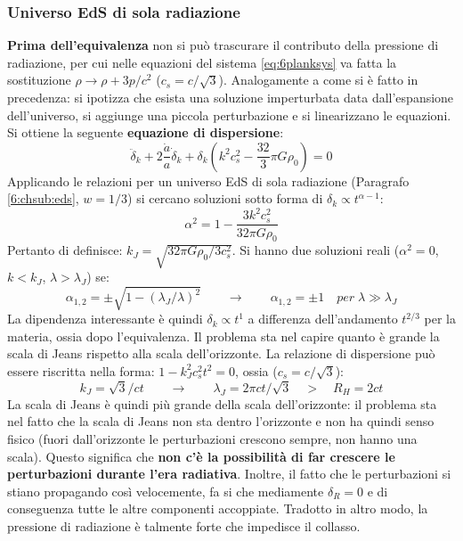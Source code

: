 \subsubsection{Universo EdS di sola radiazione}
\textbf{Prima dell'equivalenza} non si può trascurare il contributo della pressione di radiazione, per cui nelle equazioni del sistema \ref{eq:6planksys} va fatta la sostituzione $\rho \rightarrow \rho + 3p/c^2$ ($c_s=c/\sqrt{3}$). Analogamente a come si è fatto in precedenza: si ipotizza che esista una soluzione imperturbata data dall'espansione dell'universo, si aggiunge una piccola perturbazione e si linearizzano le equazioni. Si ottiene la seguente \textbf{equazione di dispersione}:
\begin{equation}
    \ddot{\delta}_k + 2 \frac{\dot{a}}{a}\dot{\delta}_k + \delta_k \left( k^2 c_s^2 -\frac{32}{3}\pi G \rho_0\right) =0
\end{equation}
Applicando le relazioni per un universo EdS di sola radiazione (Paragrafo \ref{6:chsub:eds}, $w=1/3$) si cercano soluzioni sotto forma di $\delta_k \propto t^{\alpha -1}$:
\begin{equation*}
    \alpha^2 = 1-\frac{3k^2c_s^2}{32 \pi G\rho_0}
\end{equation*}
Pertanto di definisce: $k_J=\sqrt{32\pi G \rho_0 / 3c_s^2}$. Si hanno due soluzioni reali ($\alpha^2=0$, $k<k_J$, $\lambda >\lambda_J$) se:
\begin{equation*}
    \alpha_{1,2}=\pm \sqrt{1-\left( \lambda_J /\lambda\right)^2}\qquad \rightarrow \qquad \alpha_{1,2}=\pm 1 \quad per\; \lambda \gg \lambda_J
\end{equation*}
La dipendenza interessante è quindi $\delta_k \propto t^1$ a differenza dell'andamento $t^{2/3}$ per la materia, ossia dopo l'equivalenza. Il problema sta nel capire quanto è grande la scala di Jeans rispetto alla scala dell'orizzonte. La relazione di dispersione può essere riscritta nella forma: $1-k_J^2c_s^2t^2 = 0$, ossia ($c_s=c/\sqrt{3}$): 
\begin{equation*}
    k_J = \sqrt{3}/ct \qquad\rightarrow \qquad \lambda_J = 2\pi c t /\sqrt{3} \quad > \quad R_H = 2ct
\end{equation*}
La scala di Jeans è quindi più grande della scala dell'orizzonte: il problema sta nel fatto che la scala di Jeans non sta dentro l'orizzonte e non ha quindi senso fisico (fuori dall'orizzonte le perturbazioni crescono sempre, non hanno una scala). Questo significa che \textbf{non c'è la possibilità di far crescere le perturbazioni durante l'era radiativa}. Inoltre, il fatto che le perturbazioni si stiano propagando così velocemente, fa si che mediamente $\delta_R =0$ e di conseguenza tutte le altre componenti accoppiate. Tradotto in altro modo, la pressione di radiazione è talmente forte che impedisce il collasso.

